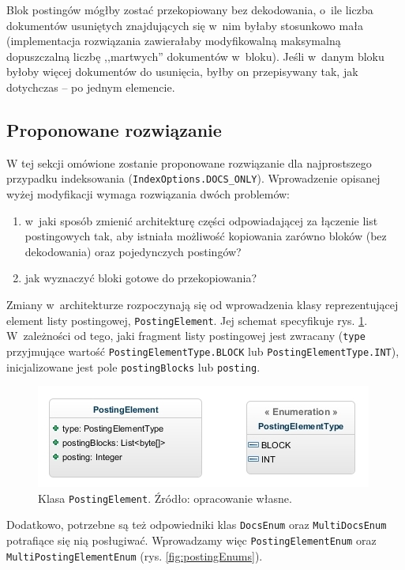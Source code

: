 Blok postingów mógłby zostać przekopiowany bez dekodowania, o~ile liczba dokumentów usuniętych znajdujących się w~nim byłaby stosunkowo mała (implementacja rozwiązania zawierałaby modyfikowalną maksymalną dopuszczalną liczbę ,,martwych'' dokumentów w~bloku). Jeśli w~danym bloku byłoby więcej dokumentów do usunięcia, byłby on przepisywany tak, jak dotychczas -- po jednym elemencie.

\subsection{Proponowane rozwiązanie}
\label{sec:solution}

W tej sekcji omówione zostanie proponowane rozwiązanie dla najprostszego przypadku indeksowania (\texttt{IndexOptions.DOCS\_ONLY}). Wprowadzenie opisanej wyżej modyfikacji wymaga rozwiązania dwóch problemów:
\begin{enumerate}
 \item w~jaki sposób zmienić architekturę części odpowiadającej za łączenie list postingowych tak, aby istniała możliwość kopiowania zarówno bloków (bez dekodowania) oraz pojedynczych postingów?
 \item jak wyznaczyć bloki gotowe do przekopiowania?
\end{enumerate}

Zmiany w~architekturze rozpoczynają się od wprowadzenia klasy reprezentującej element listy postingowej, \texttt{PostingElement}. Jej schemat specyfikuje rys. \ref{fig:postingElement}. W~zależności od tego, jaki fragment listy postingowej jest zwracany (\texttt{type} przyjmujące wartość \texttt{PostingElementType.BLOCK} lub \texttt{PostingElementType.INT}), inicjalizowane jest pole \texttt{postingBlocks} lub \texttt{posting}.

\begin{figure}[here]
 \includegraphics[scale=0.7]{pictures/PostingElement.jpg}
 \caption{Klasa \texttt{PostingElement}. Źródło: opracowanie własne. \label{fig:postingElement}}
\end{figure}

Dodatkowo, potrzebne są też odpowiedniki klas \texttt{DocsEnum} oraz \texttt{MultiDocsEnum} potrafiące się nią posługiwać. Wprowadzamy więc \texttt{PostingElementEnum} oraz \texttt{MultiPostingElementEnum} (rys. \ref{fig:postingEnums}).

